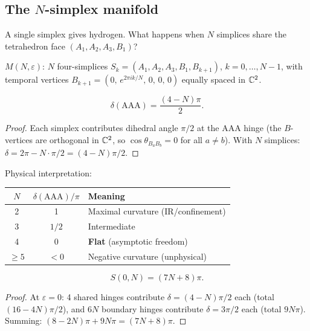 \subsection{The $N$-simplex manifold}
\label{sec:n_simplex}

A single simplex gives hydrogen.  What happens when $N$ simplices share the tetrahedron face $(A_1, A_2, A_3, B_1)$?

\begin{definition}
$M(N,\varepsilon)$: $N$ four-simplices $S_k = (A_1, A_2, A_3, B_1, B_{k+1})$, $k = 0,\ldots,N\!-\!1$, with temporal vertices $B_{k+1} = (0,\, e^{2\pi i k/N},\, 0,\, 0,\, 0)$ equally spaced in $\mathbb{C}^2$.
\end{definition}

\begin{theorem}
\label{thm:deficit_N}
\begin{equation}
\boxed{\delta(\mathrm{AAA}) = \frac{(4-N)\pi}{2}.}
\end{equation}
\end{theorem}
\begin{proof}
Each simplex contributes dihedral angle $\pi/2$ at the AAA hinge (the $B$-vertices are orthogonal in $\mathbb{C}^2$, so $\cos\theta_{B_a B_b} = 0$ for all $a \neq b$).  With $N$ simplices: $\delta = 2\pi - N\cdot\pi/2 = (4-N)\pi/2$.
\end{proof}

Physical interpretation:
\begin{center}
\begin{tabular}{ccl}
\hline
$N$ & $\delta(\mathrm{AAA})/\pi$ & Meaning \\
\hline
2 & 1 & Maximal curvature (IR/confinement) \\
3 & $1/2$ & Intermediate \\
4 & $0$ & \textbf{Flat} (asymptotic freedom) \\
$\geq 5$ & $<0$ & Negative curvature (unphysical) \\
\hline
\end{tabular}
\end{center}

\begin{theorem}
\label{thm:action_zero}
\begin{equation}
S(0, N) = (7N + 8)\pi.
\end{equation}
\end{theorem}
\begin{proof}
At $\varepsilon = 0$: 4 shared hinges contribute $\delta = (4\!-\!N)\pi/2$ each (total $(16\!-\!4N)\pi/2$), and $6N$ boundary hinges contribute $\delta = 3\pi/2$ each (total $9N\pi$).  Summing: $(8\!-\!2N)\pi + 9N\pi = (7N\!+\!8)\pi$.
\end{proof}

